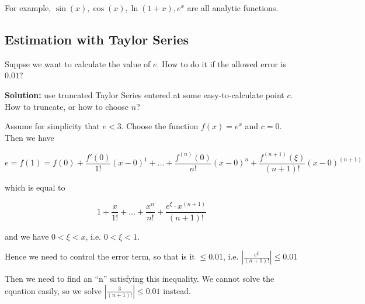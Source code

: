 For example, $\sin(x), \cos(x), \ln(1+x), e^x$ are all analytic functions.

\subsection{Estimation with Taylor Series}

Suppse we want to calculate the value of $e$. How to do it if the allowed error is $0.01$?

\textbf{Solution:} use truncated Taylor Series entered at some easy-to-calculate point $c$. \textrightarrow How to truncate, or how to choose $n$?

Assume for simplicity that $e < 3$. Choose the function $f(x) = e^x$ and $c = 0$. Then we have

$$ e = f(1) = f(0) + \frac{f'(0)}{1!} (x - 0)^1 + \dots + \frac{f^{(n)}(0)}{n!}(x - 0)^n + \frac{f^{(n+1)}(\xi)}{(n+1)!}(x - 0)^{(n+1)} $$

which is equal to

$$ 1 + \frac{x}{1!} + \dots + \frac{x^n}{n!} + \frac{e^\xi \cdot x^{(n + 1)}}{(n + 1)!} $$

and we have $0 < \xi < x$, i.e. $0 < \xi < 1$.

Hence we need to control the error term, so that is it $\leq 0.01$, i.e. $ | \frac{e^\xi}{(n + 1)!} | \leq 0.01 $

Then we need to find an ``n'' satisfying this inequality. We cannot solve the equation easily, so we solve $ | \frac{3}{(n+1)!} | \leq 0.01 $ instead.